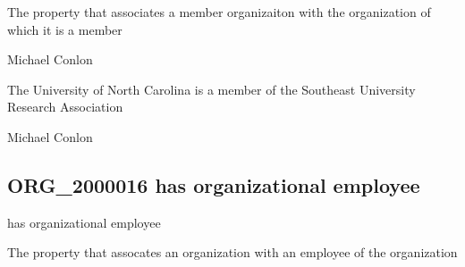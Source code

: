 \documentclass[letterpaper,10pt,english]{sphinxmanual}
\begin{document}
\begin{sphinxShadowBox}

\sphinxAtStartPar
The property that associates a member organizaiton with the organization of which it is a member
\end{sphinxShadowBox}

\begin{sphinxShadowBox}

\sphinxAtStartPar
Michael Conlon 
\end{sphinxShadowBox}

\begin{sphinxShadowBox}

\sphinxAtStartPar
The University of North Carolina is a member of the Southeast University Research Association
\end{sphinxShadowBox}

\begin{sphinxShadowBox}

\sphinxAtStartPar
Michael Conlon 
\end{sphinxShadowBox}
\begin{quote}

\ignorespaces \end{quote}


\subsection{ORG\_2000016 \sphinxhyphen{} has organizational employee}
\label{\detokenize{doc-ORG_2000016:org-2000016-has-organizational-employee}}\label{\detokenize{doc-ORG_2000016:index-0}}\label{\detokenize{doc-ORG_2000016::doc}}
\begin{sphinxShadowBox}

\sphinxAtStartPar
has organizational employee
\end{sphinxShadowBox}

\begin{sphinxShadowBox}

\sphinxAtStartPar
The property that assocates an organization with an employee of the organization
\end{sphinxShadowBox}
\end{document}
